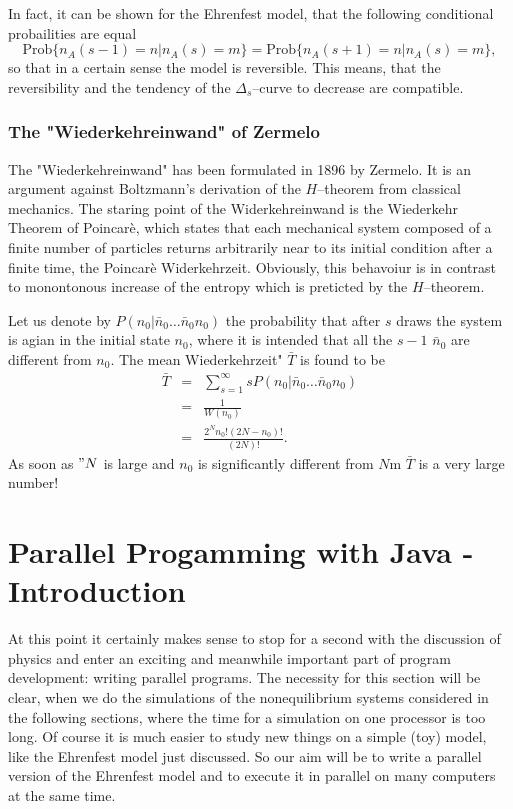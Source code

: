 In fact, it can be shown for the Ehrenfest model, that the following 
conditional probailities are equal
\begin{displaymath}
  \textrm{Prob} \{n_A(s-1)=n|n_A(s)=m \} = 
  \textrm{Prob} \{n_A(s+1)=n | n_A(s)=m \}, 
\end{displaymath}
so that in a certain sense  the model is reversible. This means, that the
reversibility and the tendency of the $\Delta_s$--curve to decrease are
compatible.

\subsubsection{The "Wiederkehreinwand" of Zermelo}
The "Wiederkehreinwand" has been formulated in 1896 by Zermelo. It is an
argument against Boltzmann's derivation  of the $H$--theorem from classical
mechanics. The staring point of the Widerkehreinwand is the Wiederkehr Theorem
of Poincar\`e, which states that each mechanical system composed of a finite
number of particles returns arbitrarily near to its initial condition after a
finite time, the Poincar\`e Widerkehrzeit. Obviously, this  behavoiur is in
contrast to monontonous increase of the entropy which is preticted by the
$H$--theorem. 

Let us denote by $P(n_0| \bar{n}_0 \ldots \bar{n}_0 n_0)$ the probability that
after $s$ draws the system is agian in the initial state $n_0$, where it is
intended that all the $s-1$ $\bar{n}_0$ are different from $n_0$. The mean
Wiederkehrzeit" $\bar{T}$ is found to be
\begin{eqnarray*}
  \bar{T} &=& \sum_{s=1}^{\infty} s P(n_0| \bar{n}_0 \ldots \bar{n}_0 n_0) \\
          & = & \frac{1}{W(n_0)} \\
          & = & \frac{2^N n_0! (2N-n_0)! }{(2N)!}.
\end{eqnarray*}
As soon as $"N$ is large and $n_0$ is significantly different from $N$m $\bar{T}$
is a very large number!


\section{Parallel Progamming with Java - Introduction}
\label{sec:ParallelJava}

At this point it certainly makes sense to stop for a second with the 
discussion of physics and enter an exciting and meanwhile important 
part of program development: writing parallel programs. The necessity
for this section will be clear, when we do the simulations of the 
nonequilibrium systems considered in the following sections, where
the time for a simulation on one processor is too long. Of 
course it is much easier to study new things on a simple (toy) model,
like the Ehrenfest model just discussed. So our aim will be to write
a parallel version of the Ehrenfest model and to execute it in parallel
on many computers at the same time.

